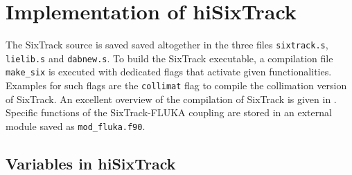 \newpage

\section{Implementation of hiSixTrack}

The SixTrack source is saved saved altogether in the three files \lstinline{sixtrack.s}, \lstinline{lielib.s} and \mbox{\lstinline{dabnew.s}}. To build the SixTrack executable, a compilation file \lstinline{make_six} is executed with dedicated flags that activate given functionalities. Examples for such flags are the \lstinline{collimat} flag to compile the collimation version of SixTrack. An excellent overview of the compilation of SixTrack is given in \cite{Fjellstrom:1642385}. Specific functions of the SixTrack-FLUKA coupling are stored in an external module saved as \lstinline{mod_fluka.f90}. 



\subsection{Variables in hiSixTrack}

